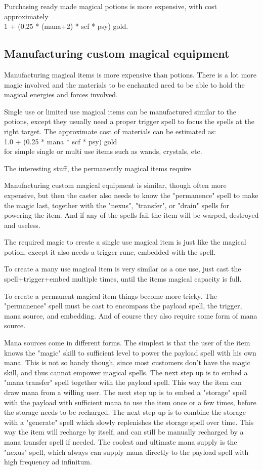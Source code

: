 Purchasing ready made magical potions is more expensive, with cost approximately \\ 1 + (0.25 * (mana+2) * scf * psy) gold.


\subsection*{Manufacturing custom magical equipment}
Manufacturing magical items is more expensive than potions. There is a lot more magic involved and the materials to be enchanted need to be able to hold the magical energies and forces involved.

Single use or limited use magical items can be manufactured similar to the potions, except they usually need a proper trigger spell to focus the spells at the right target.
The approximate cost of materials can be estimated as: \\
1.0 + (0.25 * mana * scf * psy) gold \\
for simple single or multi use items such as wands, crystals, etc.

The interesting stuff, the permanently magical items require



Manufacturing custom magical equipment is similar, though often more expensive, but then the caster also needs to know the "permanence" spell to make the magic last, together with the "nexus", "transfer", or "drain" spells for powering the item. And if any of the spells fail the item will be warped, destroyed and useless.

The required magic to create a single use magical item is just like the magical potion, except it also needs a trigger rune, embedded with the spell.

To create a many use magical item is very similar as a one use, just cast the spell+trigger+embed multiple times, until the items magical capacity is full.

To create a permanent magical item things become more tricky. The "permanence" spell must be cast to encompass the payload spell, the trigger, mana source, and embedding. And of course they also require some form of mana source.

Mana sources come in different forms. The simplest is that the user of the item knows the "magic" skill to sufficient level to power the payload spell with his own mana. This is not so handy though, since most customers don't have the magic skill, and thus cannot empower magical spells.
The next step up is to embed a "mana transfer" spell together with the payload spell. This way the item can draw mana from a willing user.
The next step up is to embed a "storage" spell with the payload with sufficient mana to use the item once or a few times, before the storage needs to be recharged.
The next step up is to combine the storage with a "generate" spell which slowly replenishes the storage spell over time. This way the item will recharge by itself, and can still be manually recharged by a mana transfer spell if needed.
The coolest and ultimate mana supply is the "nexus" spell, which always can supply mana directly to the payload spell with high frequency ad infinitum.

